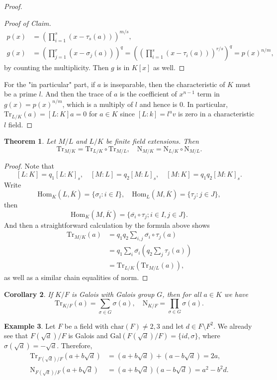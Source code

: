 \documentclass[12pt]{report}
\newtheorem{thm}{Theorem}[section]
\newtheorem{cor}[thm]{Corollary}
\theoremstyle{definition}
\newtheorem{example}[thm]{Example}
\def\Tr{\text{Tr}}
\def\nm{\text{N}}
\def\Hom{\text{Hom}}
\def\Gal{\text{Gal}}
\def\char{\text{char}}
\begin{document}
\begin{proof}
\begin{proof}[Proof of Claim]
        \begin{align*}
            p(x) &= (\prod_{i=1}^s(x-\tau_s(a)))^{m/s},\\
            g(x) &= (\prod_{j=1}^r(x-\sigma_j(a)))^q =((\prod_{i=1}^s(x-\tau_i(a)))^{r/s})^q = p(x)^{n/m},
        \end{align*} by counting the multiplicity. Then $g$ is in $K[x]$ as well.
    \end{proof}

    For the "in particular" part, if $a$ is inseparable, then the characteristic of $K$ must be a prime $l$. And then the trace of $a$ is the coefficient of $x^{n-1}$ term in $g(x)=p(x)^{n/m}$, which is a multiply of $l$ and hence is 0. In particular, $\Tr_{L/K}(a)=[L:K] a = 0$ for $a\in K$ since $[L:k]=l^uv$ is zero in a characteristic $l$ field.
\end{proof}

\begin{thm}
    Let $M/L$ and $L/K$ be finite field extensions. Then $$\Tr_{M/K} = \Tr_{L/K}\circ\Tr_{M/L},\quad \nm_{M/K}=\nm_{L/K}\circ\nm_{M/L}.$$
\end{thm}

\begin{proof}
    Note that $$[L:K]=q_1[L:K]_s,\quad [M:L]=q_2[M:L]_s,\quad [M:K]=q_1q_2[M:K]_s.$$ Write $$\Hom_K(L,\overline{K}) = \{\sigma_i: i \in I\},\quad \Hom_L(M,\overline{K}) = \{\tau_j: j \in J\},$$ then $$\Hom_K(M,\overline{K}) = \{\overline{\sigma_i} \circ \tau_j ; i \in I, j \in J\}.$$ And then a straightforward calculation by the formula above shows \begin{align*}
        \Tr_{M/K}(a)&=q_1q_2\sum_{i,j} \overline{\sigma_i}\circ\tau_j(a) \\
        &= q_1 \sum_i\overline{\sigma_i}(q_2\sum_j \tau_j(a)) \\
        &=\Tr_{L/K}(\Tr_{M/L}(a)),
    \end{align*} 
    as well as a similar chain equalities of norm.
\end{proof}

\begin{cor}
    If $K/F$ is Galois with Galois group $G$, then for all $a\in K$ we have $$\Tr_{K/F}(a)=\sum_{\sigma\in G}\sigma(a),\quad \nm_{K/F}=\prod_{\sigma\in G}\sigma(a).$$
\end{cor}

\begin{example}
    Let $F$ be a field with $\char(F)\not=2,3$ and let $d\in F\setminus F^2$. We already see that $F(\sqrt{d})/F$ is Galois and $\Gal(F(\sqrt{d})/F)=\{id,\sigma\}$, where $\sigma(\sqrt{d})=-\sqrt{d}$. Therefore, 
    \begin{align*}
        \Tr_{F(\sqrt{d})/F}(a+b\sqrt{d})&=(a+b\sqrt{d})+(a-b\sqrt{d})=2a,\\
        \nm_{F(\sqrt{d})/F}(a+b\sqrt{d}) &=(a+b\sqrt{d})(a-b\sqrt{d})=a^2-b^2d.
    \end{align*} 
\end{example}
\end{document}
